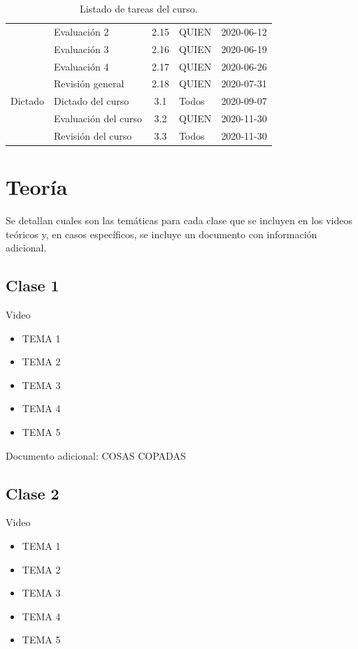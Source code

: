 \documentclass[12pt]{report}
\begin{document}
\begin{table}[h!]
\begin{tabular}{@{}llclc@{}}
        & Evaluación 2         & 2.15   & QUIEN      & 2020-06-12 \\
        & Evaluación 3         & 2.16   & QUIEN      & 2020-06-19 \\
        & Evaluación 4         & 2.17   & QUIEN      & 2020-06-26 \\
        & Revisión general     & 2.18   & QUIEN             & 2020-07-31 \\\midrule
Dictado & Dictado del curso    & 3.1    & Todos                   & 2020-09-07 \\ 
        & Evaluación del curso & 3.2    & QUIEN        & 2020-11-30 \\
        & Revisión del curso   & 3.3    & Todos                   & 2020-11-30 \\ \bottomrule
\end{tabular}
\caption{Listado de tareas del curso.}
\end{table}

\chapter{Teoría}\label{teoria}

Se detallan cuales son las temáticas para cada clase que se incluyen en los videos teóricos y, en casos específicos, se incluye un documento con información adicional.

\section{Clase 1}
Video 

\begin{itemize}
    \item TEMA 1
    \item TEMA 2
    \item TEMA 3
    \item TEMA 4
    \item TEMA 5
\end{itemize}

Documento adicional: COSAS COPADAS

\section{Clase 2}

Video

\begin{itemize}
    \item TEMA 1
    \item TEMA 2
    \item TEMA 3
    \item TEMA 4
    \item TEMA 5
\end{itemize}
\end{document}
